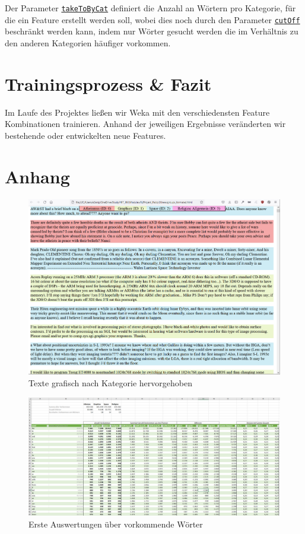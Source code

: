 \documentclass[
	11pt,
	a4paper
]{scrartcl}
\newcommand{\code}[1]{\texttt{\ul{#1}}}
\begin{document}
Der Parameter \code{takeToByCat} definiert die Anzahl an Wörtern pro Kategorie, für die ein Feature erstellt werden soll, wobei dies noch
durch den Parameter \code{cutOff} beschränkt werden kann, indem nur Wörter gesucht werden die im Verhältnis zu den anderen Kategorien 
häufiger vorkommen.


\section{Trainingsprozess \& Fazit}\label{trainingsprozess}
Im Laufe des Projektes ließen wir Weka mit den verschiedensten Feature Kombinationen trainieren. Anhand der jeweiligen Ergebnisse
veränderten wir bestehende oder entwickelten neue Features.\\






\newpage
\section{Anhang}

\begin{figure}[H]
	\includegraphics[width=\textwidth]{figures/texte_grafisch_getrennt.png}
	\caption{Texte grafisch nach Kategorie hervorgehoben}
	\label{fig:texte_grafisch_getrennt}
\end{figure}

\begin{figure}[H]
	\includegraphics[width=\textwidth]{figures/wort_auswertung_excel.png}
	\caption{Erste Auswertungen über vorkommende Wörter}
	\label{fig:wort_auswertung_excel}
\end{figure}
\end{document}
